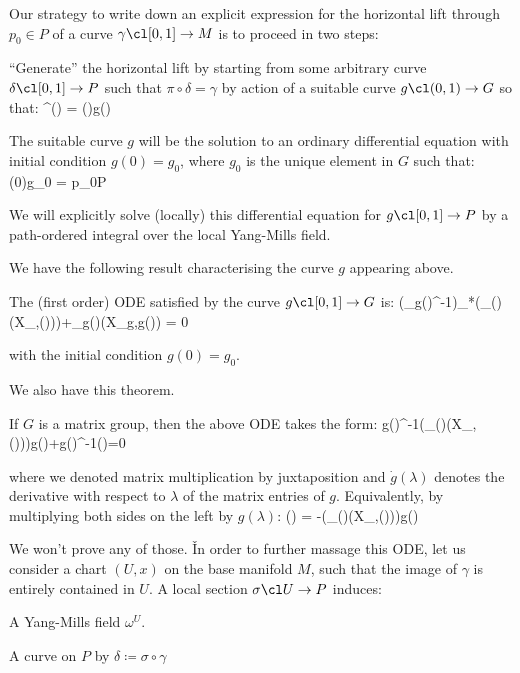 Our strategy to write down an explicit expression for the horizontal lift through $p_0\in P$ of a curve $\gamma\cl
[0,1]\to M$ is to proceed in two steps:

\ben[label=\roman*)]
\item ``Generate'' the horizontal lift by starting from some arbitrary curve $\delta\cl [0,1]\to P$ such that
$\pi\circ \delta = \gamma$ by action of a suitable curve $g\cl (0,1)\to G$ so that:
\bse
\gamma^\uparrow(\lambda) = \delta(\lambda)\racts g(\lambda)
\ese

The suitable curve $g$ will be the solution to an ordinary differential equation with initial condition $g(0)=g_0$,
where $g_0$ is the unique element in $G$ such that:
\bse
\delta(0)\racts g_0 = p_0\in P
\ese

\item We will explicitly solve (locally) this differential equation for $g\cl [0,1]\to P$ by a path-ordered integral
over the local Yang-Mills field.
\een

We have the following result characterising the curve $g$ appearing above.

\bt[]
The (first order) ODE satisfied by the curve $g\cl[0,1]\to G$ is:
\bse
(\Ad_{g(\lambda)^{-1}})_*(\omega_{\delta(\lambda)}(X_{\delta,\delta(\lambda)}))+\Xi_{g(\lambda)}(X_{g,g(\lambda)}) = 0
\ese

with the initial condition $g(0)=g_0$.
\et

We also have this theorem.

\bt[]
If $G$ is a matrix group, then the above ODE takes the form:
\bse
g(\lambda)^{-1}(\omega_{\delta(\lambda)}(X_{\delta,\delta(\lambda)}))g(\lambda)+g(\lambda)^{-1}(\lambda)=0
\ese

where we denoted matrix multiplication by juxtaposition and $\dot g(\lambda) $ denotes the derivative with respect to
$\lambda$ of the matrix entries of $g$. Equivalently, by multiplying both sides on the left by $g(\lambda)$:
\bse
{}(\lambda) = -(\omega_{\delta(\lambda)}(X_{\delta,\delta(\lambda)}))g(\lambda)
\ese
\et

We won't prove any of those. \v

In order to further massage this ODE, let us consider a chart $(U,x)$ on the base manifold $M$, such that the image
of $\gamma$ is entirely contained in $U$. A local section $\sigma\cl U \to P$ induces:
\ben[label=\roman*)]
\item A Yang-Mills field $\omega^U$.
\item A curve on $P$ by $\delta \coloneqq \sigma \circ \gamma$
\een

